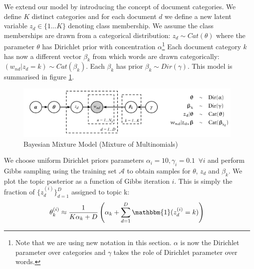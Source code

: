 \documentclass[]{article}
\newcommand{\Acal}{\mathcal{A}}
\begin{document}
We extend our model by introducing the concept of document categories. We define $K$ distinct categories and for each document $d$ we define a new latent variable $z_d \in \{1 \dots K\}$ denoting class membership. We assume the class memberships are drawn from a categorical distribution: $z_d \sim Cat(\theta)$ where the parameter $\theta$ has Dirichlet prior with concentration $\alpha$\footnote{Note that we are using new notation in this section. $\alpha$ is now the Dirichlet parameter over categories and $\gamma$ takes the role of Dirichlet parameter over words.} Each document category $k$ has now a different vector $\beta_k$ from which words are drawn categorically: $(w_{nd} | z_d = k) \sim Cat(\beta_k)$. Each $\beta_k$ has prior $\beta_k \sim Dir(\gamma)$. This model is summarised in figure \ref{fig:bayesian-mixture}.
%
\begin{figure}[!h]
	\centering
	\includegraphics[width=0.6\linewidth]{bayesian-mixture.png}
	\caption{Bayesian Mixture Model (Mixture of Multinomials)}
	\label{fig:bayesian-mixture}
\end{figure}

We choose uniform Dirichlet priors parameters $\alpha_i = 10, \gamma_i = 0.1 \enspace \forall i$ and perform Gibbs sampling using the training set $\Acal$ to obtain samples for $\theta$, $z_d$ and $\beta_k$. We plot the topic posterior as a function of Gibbs iteration $i$. This is simply the fraction of $\{z_d^{(i)}\}_{d=1}^{D}$ assigned to topic k:
%
\begin{equation}
	\theta^{(i)}_k \approx \frac{1}{K\alpha_k + D} \left( \alpha_k + \sum_{d=1}^{D} \mathbbm{1}(z^{(i)}_d = k) \right)
	\label{eqn:bmm-topic-post}
\end{equation}
\end{document}
